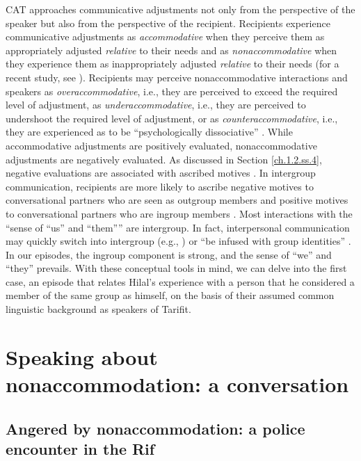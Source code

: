 \documentclass[output=paper,colorlinks,citecolor=brown]{langscibook}
\begin{document}
CAT approaches communicative adjustments not only from the perspective of the speaker but also from the perspective of the recipient. Recipients experience communicative adjustments as \textit{accommodative} when they perceive them as appropriately adjusted \textit{relative} to their needs and as \textit{nonaccommodative} when they experience them as inappropriately adjusted \textit{relative} to their needs (for a recent study, see \citealt{petrou_dragojevic2024}). Recipients may perceive nonaccommodative interactions and speakers as \textit{overaccommodative}, i.e., they are perceived to exceed the required level of adjustment, as \textit{underaccommodative}, i.e., they are perceived to undershoot the required level of adjustment, or as \textit{counteraccommodative}, i.e., they are experienced as to be ``psychologically dissociative'' \citep[32]{coupland_coupland_giles_henwood1988}. 
While accommodative adjustments are positively evaluated, nonaccommodative adjustments are negatively evaluated. As discussed in Section \ref{ch.1.2.ss.4}, negative evaluations are associated with ascribed motives \citep{gasiorek_giles2012}. In intergroup communication, recipients are more likely to ascribe negative motives to conversational partners who are seen as outgroup members and positive motives to conversational partners who are ingroup members \citep{gasiorek2016a}. Most interactions with the ``sense of ``us'' and ``them'''' \citep[308]{gallois_watson_giles2018} are intergroup. In fact, interpersonal communication may quickly switch into intergroup (e.g., \citealt{gallois_watson_giles2018}) or ``be infused with group identities'' \citep[30]{dragojevic_giles2014}. In our episodes, the ingroup component is strong, and the sense of ``we'' and ``they'' prevails.
With these conceptual tools in mind, we can delve into the first case, an episode that relates Hilal's experience with a person that he considered a member of the same group as himself, on the basis of their assumed common linguistic background as speakers of Tarifit. 

\section{Speaking about nonaccommodation: a conversation}\label{CH1.1.ss.4}

\subsection{Angered by nonaccommodation: a police encounter in the Rif}\label{CH1.1.ss.4.1}
\end{document}
